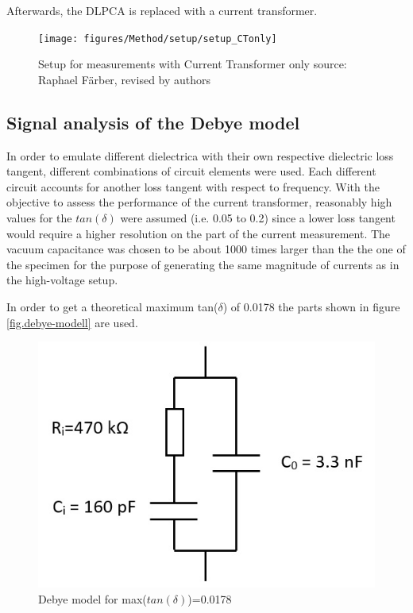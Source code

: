 Afterwards, the DLPCA is replaced with a current transformer. 
\begin{figure}[htbp]
	\centering
	\texttt{[image: figures/Method/setup/setup\_CTonly]}		
	\caption[Kurze Abbildungsbeschreibung]{Setup for measurements with Current Transformer only {source: Raphael F\"arber, revised by authors}} 
	\label{sec.setup}

\end{figure}


\subsection{Signal analysis of the Debye model}

In order to emulate different dielectrica with their own respective dielectric loss tangent, different combinations of circuit elements were used.
Each different circuit accounts for another loss tangent with respect to frequency. With the objective to assess the performance of the current transformer, reasonably high values for the $tan\left(\delta\right)$ were assumed (i.e. 0.05 to 0.2) since a lower loss tangent
would require a higher resolution on the part of the current measurement. The vacuum capacitance was chosen to be about 1000 times larger than
the the one of the specimen for the purpose of generating the same magnitude of currents as in the high-voltage setup.


In order to get a theoretical maximum tan($\delta$) of 0.0178 the parts shown in figure \ref{fig.debye-modell} are used. 
\begin{figure}[h!tb]
	\centerline{\includegraphics[scale=0.7]{figures/Method/debye-modell.jpg}}	
	\caption{Debye model for max($tan(\delta)$)=0.0178 }	
	\label{fig.debye-modellsch}
\end{figure}

